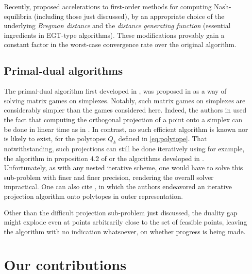 \documentclass[a4paper,9pt]{extarticle}
\DeclareMathOperator{\proj}{proj}
\begin{document}
Recently, \cite{kroer2015} proposed accelerations to first-order
methods for computing Nash-equilibria (including those just
discussed), by an appropriate choice of the underlying \textit{Bregman
distance} and the \textit{distance generating function} (essential
ingredients in EGT-type algorithms). These modifications provably
gain a constant factor in the worst-case convergence rate over the
original algorithm. %

\subsection{Primal-dual algorithms}
The primal-dual algorithm first developed in \cite{chambolle2010}, was
proposed in \cite{chambolle2014ergodic} as a way of solving matrix
games on simplexes. Notably, such matrix games on
simplexes are considerably simpler than the games considered
here. Indeed, the authors in \cite{chambolle2014ergodic} used the fact
that computing the orthogonal projection of a point onto a simplex can
be done in linear time as in \cite{duchi2008efficient}. In contrast,
no such efficient algorithm is known nor is likely to exist, for the
polytopes $Q_k$ defined in \eqref{eq:polytope}. %
That notwithstanding, such projections can still be done iteratively
using for example, the algorithm in proposition 4.2 of
\cite{combettes2010dualization} or the algorithms developed in
\cite{tran2015splitting}. Unfortunately, as with any nested iterative
scheme, one would have to solve this sub-problem with finer and finer
precision, rendering the overall solver impractical. One can also cite
\cite{nurminski2008}, in which the authors endeavored an iterative
projection algorithm onto polytopes in outer representation.

Other than the difficult projection sub-problem just discussed,
the duality gap might explode even at points arbitrarily
 close to the set of feasible points, leaving the algorithm with no
 indication whatsoever, on whether progress is being made.


\section{Our contributions}
\label{sec:gsp}
\end{document}
